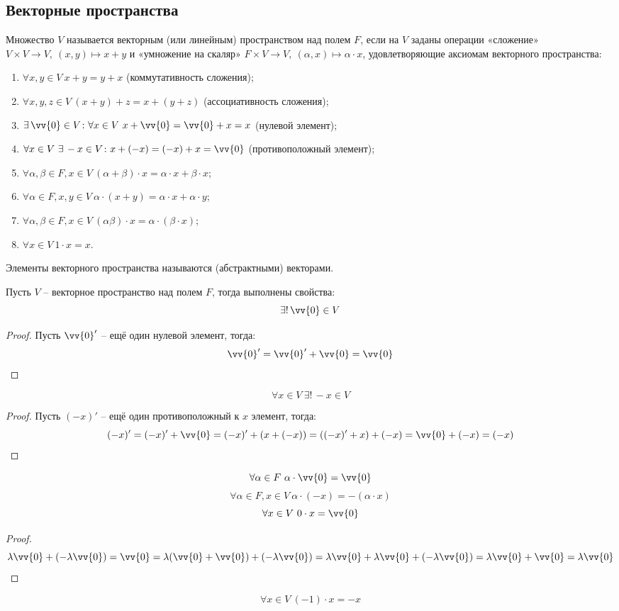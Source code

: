 \documentclass[12pt]{article}
\begin{document}
\subsection{Векторные пространства}

\begin{definition}
	Множество $V$ называется векторным (или линейным) пространством над
	полем $F$, если на $V$ заданы операции «сложение» $V\times V\to
	V,\ (x, y)\mapsto x+y$ и «умножение на скаляр» $F\times V\to
	V,\ (\alpha, x)\mapsto \alpha\cdot x$, удовлетворяющие аксиомам
	векторного пространства:
	\begin{center}
		\begin{minipage}{0.86\textwidth}
			\begin{enumerate}[itemsep=0pt]
				\item $\forall x, y\in V\ x+y=y+x$ (коммутативность сложения);
				\item $\forall x, y, z\in V\ (x+y)+z=x+(y+z)$ (ассоциативность сложения);
				\item $\exists\,\vv{0}\in V\colon\forall x\in
					V\ x+\vv{0}=\vv{0}+x=x$ (нулевой элемент);
				\item $\forall x\in V\ \exists\,-x\in V\colon
					x+(-x)=(-x)+x=\vv{0}$ (противоположный элемент);
				\item $\forall\alpha,\beta\in F, x\in V\ (\alpha+\beta)\cdot
					x=\alpha\cdot x+\beta\cdot x$;
				\item $\forall\alpha\in F, x, y\in
					V\ \alpha\cdot(x+y)=\alpha\cdot x+\alpha\cdot y$;
				\item $\forall\alpha,\beta\in F, x\in V\ (\alpha\beta)\cdot
					x=\alpha\cdot(\beta\cdot x)$;
				\item $\forall x\in V\ 1\cdot x=x$.
			\end{enumerate}
		\end{minipage}
	\end{center}
\end{definition}
\begin{definition}
	Элементы векторного пространства называются (абстрактными) векторами.
\end{definition}
\begin{statement}
	Пусть $V$ -- векторное пространство над полем $F$, тогда выполнены свойства:
	\[\exists!\,\vv{0}\in V\]
	\begin{proof}
		Пусть $\vv{0}'$ -- ещё один нулевой элемент, тогда:
		\[\vv{0}'=\vv{0}'+\vv{0}=\vv{0}\]
	\end{proof}
	\[\forall x\in V\ \exists!\,-x\in V\]
	\begin{proof}
		Пусть $(-x)'$ -- ещё один противоположный к $x$ элемент, тогда:
		\[(-x)'=(-x)'+\vv{0}=(-x)'+(x+(-x))=((-x)'+x)+(-x)=\vv{0}+(-x)=(-x)\]
	\end{proof}
	\[\forall\alpha\in F\ \alpha\cdot\vv{0}=\vv{0}\]
	\[\forall\alpha\in F, x\in V\ \alpha\cdot(-x)=-(\alpha\cdot x)\]
	\[\forall x\in V\ 0\cdot x=\vv{0}\]
	\begin{proof}
		\[\lambda\vv{0}+(-\lambda\vv{0})=\vv{0}=\lambda(\vv{0}+\vv{0})+(-\lambda\vv{0})=\lambda\vv{0}+\lambda\vv{0}+(-\lambda\vv{0})=\lambda\vv{0}+\vv{0}=\lambda\vv{0}\]
	\end{proof}
	\[\forall x\in V\ (-1)\cdot x=-x\]
\end{statement}
\end{document}
